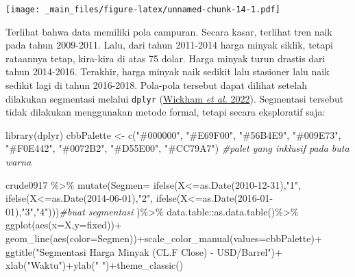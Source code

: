 \documentclass[
]{book}
\newenvironment{Shaded}{\begin{snugshade}}{\end{snugshade}}
\newcommand{\AttributeTok}[1]{\textcolor[rgb]{0.77,0.63,0.00}{#1}}
\newcommand{\CommentTok}[1]{\textcolor[rgb]{0.56,0.35,0.01}{\textit{#1}}}
\newcommand{\FunctionTok}[1]{\textcolor[rgb]{0.00,0.00,0.00}{#1}}
\newcommand{\NormalTok}[1]{#1}
\newcommand{\OtherTok}[1]{\textcolor[rgb]{0.56,0.35,0.01}{#1}}
\newcommand{\SpecialCharTok}[1]{\textcolor[rgb]{0.00,0.00,0.00}{#1}}
\newcommand{\StringTok}[1]{\textcolor[rgb]{0.31,0.60,0.02}{#1}}
\begin{document}
\texttt{[image: \_main\_files/figure-latex/unnamed-chunk-14-1.pdf]}

Terlihat bahwa data memiliki pola campuran. Secara kasar, terlihat tren naik pada tahun 2009-2011. Lalu, dari tahun 2011-2014 harga minyak siklik, tetapi rataannya tetap, kira-kira di atas 75 dolar. Harga minyak turun drastis dari tahun 2014-2016. Terakhir, harga minyak naik sedikit lalu stasioner lalu naik sedikit lagi di tahun 2016-2018. Pola-pola tersebut dapat dilihat setelah dilakukan segmentasi melalui \texttt{dplyr} (\protect\hyperlink{ref-R-dplyr}{Wickham \emph{et al.} 2022}). Segmentasi tersebut tidak dilakukan menggunakan metode formal, tetapi secara eksploratif saja:

\begin{Shaded}
\begin{Highlighting}[]
\FunctionTok{library}\NormalTok{(dplyr)}
\NormalTok{cbbPalette }\OtherTok{\textless{}{-}} \FunctionTok{c}\NormalTok{(}\StringTok{"\#000000"}\NormalTok{, }\StringTok{"\#E69F00"}\NormalTok{, }\StringTok{"\#56B4E9"}\NormalTok{, }\StringTok{"\#009E73"}\NormalTok{, }
                \StringTok{"\#F0E442"}\NormalTok{, }\StringTok{"\#0072B2"}\NormalTok{, }\StringTok{"\#D55E00"}\NormalTok{, }\StringTok{"\#CC79A7"}\NormalTok{)}
\CommentTok{\#palet yang inklusif pada buta warna}

\NormalTok{crude0917 }\SpecialCharTok{\%\textgreater{}\%}
  \FunctionTok{mutate}\NormalTok{(}\AttributeTok{Segmen=}
           \FunctionTok{ifelse}\NormalTok{(X}\SpecialCharTok{\textless{}=}\FunctionTok{as.Date}\NormalTok{(}\StringTok{\textquotesingle{}2010{-}12{-}31\textquotesingle{}}\NormalTok{),}\StringTok{"1"}\NormalTok{,}
           \FunctionTok{ifelse}\NormalTok{(X}\SpecialCharTok{\textless{}=}\FunctionTok{as.Date}\NormalTok{(}\StringTok{\textquotesingle{}2014{-}06{-}01\textquotesingle{}}\NormalTok{),}\StringTok{"2"}\NormalTok{,}
           \FunctionTok{ifelse}\NormalTok{(X}\SpecialCharTok{\textless{}=}\FunctionTok{as.Date}\NormalTok{(}\StringTok{\textquotesingle{}2016{-}01{-}01\textquotesingle{}}\NormalTok{),}\StringTok{"3"}\NormalTok{,}\StringTok{"4"}\NormalTok{)))}\CommentTok{\#buat segmentasi }
\NormalTok{  )}\SpecialCharTok{\%\textgreater{}\%}\NormalTok{ data.table}\SpecialCharTok{::}\FunctionTok{as.data.table}\NormalTok{()}\SpecialCharTok{\%\textgreater{}\%}
  \FunctionTok{ggplot}\NormalTok{(}\FunctionTok{aes}\NormalTok{(}\AttributeTok{x=}\NormalTok{X,}\AttributeTok{y=}\NormalTok{fixed))}\SpecialCharTok{+}
    \FunctionTok{geom\_line}\NormalTok{(}\FunctionTok{aes}\NormalTok{(}\AttributeTok{color=}\NormalTok{Segmen))}\SpecialCharTok{+}\FunctionTok{scale\_color\_manual}\NormalTok{(}\AttributeTok{values=}\NormalTok{cbbPalette)}\SpecialCharTok{+}
    \FunctionTok{ggtitle}\NormalTok{(}\StringTok{"Segmentasi Harga Minyak (CL.F Close) {-} USD/Barrel"}\NormalTok{)}\SpecialCharTok{+}
    \FunctionTok{xlab}\NormalTok{(}\StringTok{"Waktu"}\NormalTok{)}\SpecialCharTok{+}\FunctionTok{ylab}\NormalTok{(}\StringTok{" "}\NormalTok{)}\SpecialCharTok{+}\FunctionTok{theme\_classic}\NormalTok{()}
\end{Highlighting}
\end{Shaded}
\end{document}

